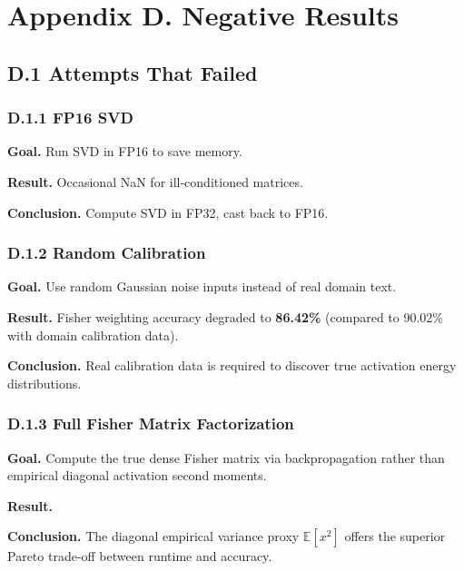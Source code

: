 
\section{Appendix D. Negative Results}

\subsection{D.1 Attempts That Failed}

\subsubsection{D.1.1 FP16 SVD}

\textbf{Goal.} Run SVD in FP16 to save memory.

\textbf{Result.} Occasional NaN for ill-conditioned matrices.

\textbf{Conclusion.} Compute SVD in FP32, cast back to FP16.

\subsubsection{D.1.2 Random Calibration}

\textbf{Goal.} Use random Gaussian noise inputs instead of real domain text.

\textbf{Result.} Fisher weighting accuracy degraded to \textbf{86.42\%} (compared to 90.02\% with domain calibration data).

\textbf{Conclusion.} Real calibration data is required to discover true activation energy distributions.

\subsubsection{D.1.3 Full Fisher Matrix Factorization}

\textbf{Goal.} Compute the true dense Fisher matrix via backpropagation rather than empirical diagonal activation second moments.

\textbf{Result.} 
\textbf{Conclusion.} The diagonal empirical variance proxy $\mathbb{E}[x^2]$ offers the superior Pareto trade-off between runtime and accuracy.

